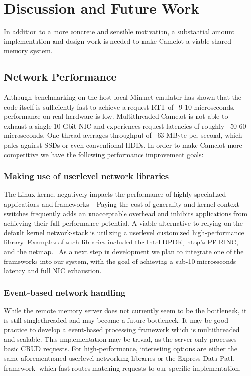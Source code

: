 \section{Discussion and Future Work}
In addition to a more concrete and sensible motivation, a substantial amount implementation and design work is needed to make Camelot a viable shared memory system.
\subsection{Network Performance}
Although benchmarking on the host-local Mininet emulator has shown that the code itself is sufficiently fast to achieve a request RTT of ~9-10 microseconds, performance on real hardware is low. Multithreaded Camelot is not able to exhaust a single 10-Gbit NIC and experiences request latencies of roughly ~50-60 microseconds. One thread averages throughput of ~63 MByte per second,  which pales against SSDs or even conventional HDDs.
In order to make Camelot more competitive we have the following performance improvement goals:
\subsubsection{Making use of userlevel network libraries}
The Linux kernel negatively impacts the performance of highly specialized applications and frameworks.~\cite{packet_io} Paying the cost of generality and kernel context-switches frequently adds an unacceptable overhead and inhibits applications from achieving their full performance potential. A viable alternative to relying on the default kernel network-stack is utilizing a userlevel customized high-performance library. Examples of such libraries included the Intel DPDK, ntop's PF-RING, and the netmap.~\cite{packet_io}
As a next step in development we plan to integrate one of the frameworks into our system, with the goal of achieving a sub-10 microseconds latency and full NIC exhaustion.
\subsubsection{Event-based network handling}
While the remote memory server does not currently seem to be the bottleneck, it is still singlethreaded and may become a future bottleneck. It may be good practice to develop a event-based processing framework which is multithreaded and scalable. This implementation may be trivial, as the server only processes basic CRUD requests. For high-performance, interesting options are either the same aforementioned userlevel networking libraries or the Express Data Path~\cite{xdp} framework, which fast-routes matching requests to our specific implementation.


